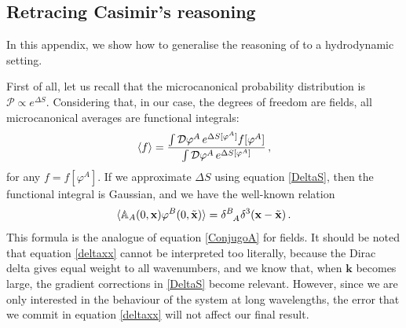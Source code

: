\documentclass[a4paper, amsfonts, amssymb, amsmath, reprint, showkeys, nofootinbib, twoside, onecolumn,notitlepage]{revtex4-1}
\begin{document}
\subsection{Retracing Casimir's reasoning}\label{AAA}

In this appendix, we show how to generalise the reasoning of \citet{Onsager_Casimir} to a hydrodynamic setting. 

First of all, let us recall that the microcanonical probability distribution is $\mathcal{P}\propto e^{\Delta S}$. Considering that, in our case, the degrees of freedom are fields, all microcanonical averages are functional integrals:
\begin{equation}
\braket{f} = \dfrac{\int \mathcal{D} \varphi^A \,  e^{\Delta S[\varphi^A]} f[\varphi^A]}{\int \mathcal{D} \varphi^A \, e^{\Delta S[\varphi^A]} } \, ,
\end{equation}
for any $f=f[\varphi^A]$.
If we approximate $\Delta S$ using equation \eqref{DeltaS}, then the functional integral is Gaussian, and we have the well-known relation
\begin{equation}\label{deltaxx}
\braket{\mathbb{A}_A(0,\textbf{x}) \varphi^B(0,\tilde{\textbf{x}})}= \delta \indices{^B _A} \delta^3(\textbf{x}-\tilde{\textbf{x}}) \, .
\end{equation}
This formula is the analogue of equation \eqref{ConjugoA} for fields. It should be noted that equation \eqref{deltaxx} cannot be interpreted too literally, because the Dirac delta gives equal weight to all wavenumbers, and we know that, when $\textbf{k}$ becomes large, the gradient corrections in \eqref{DeltaS} become relevant. However, since we are only interested in the behaviour of the system at long wavelengths, the error that we commit in equation \eqref{deltaxx} will not affect our final result.
\end{document}

